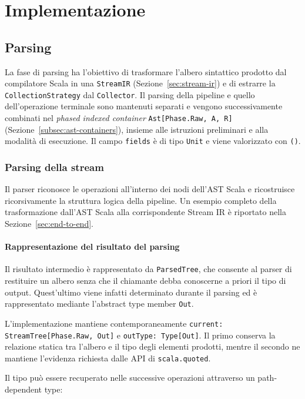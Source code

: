 \documentclass[a4paper,11pt]{report}
\theoremstyle{definition}
\begin{document}
\chapter{Implementazione}
\label{chap:implementazione}

\section{Parsing}
La fase di parsing ha l'obiettivo di trasformare l'albero sintattico prodotto dal compilatore Scala in una \texttt{StreamIR} (Sezione~\ref{sec:stream-ir}) e di estrarre la \texttt{CollectionStrategy} dal \texttt{Collector}. Il parsing della pipeline e quello dell'operazione terminale sono mantenuti separati e vengono successivamente combinati nel \emph{phased indexed container} \texttt{Ast[Phase.Raw, A, R]} (Sezione~\ref{subsec:ast-containers}), insieme alle istruzioni preliminari e alla modalità di esecuzione. Il campo \texttt{fields} è di tipo \texttt{Unit} e viene valorizzato con \texttt{()}.

\subsection{Parsing della stream}
\label{sec:parsing}

Il parser riconosce le operazioni all'interno dei nodi dell'AST Scala e ricostruisce ricorsivamente la struttura logica della pipeline. Un esempio completo della trasformazione dall'AST Scala alla corrispondente Stream IR è riportato nella Sezione~\ref{sec:end-to-end}.

\subsubsection{Rappresentazione del risultato del parsing}

Il risultato intermedio è rappresentato da \texttt{ParsedTree}, che consente al parser di restituire un albero senza che il chiamante debba conoscerne a priori il tipo di output. Quest'ultimo viene infatti determinato durante il parsing ed è rappresentato mediante l'abstract type member \texttt{Out}.

L'implementazione mantiene contemporaneamente \texttt{current: StreamTree[Phase.Raw, Out]} e \texttt{outType: Type[Out]}. Il primo conserva la relazione statica tra l'albero e il tipo degli elementi prodotti, mentre il secondo ne mantiene l'evidenza richiesta dalle API di \texttt{scala.quoted}.

Il tipo può essere recuperato nelle successive operazioni attraverso un path-dependent type:
\end{document}
